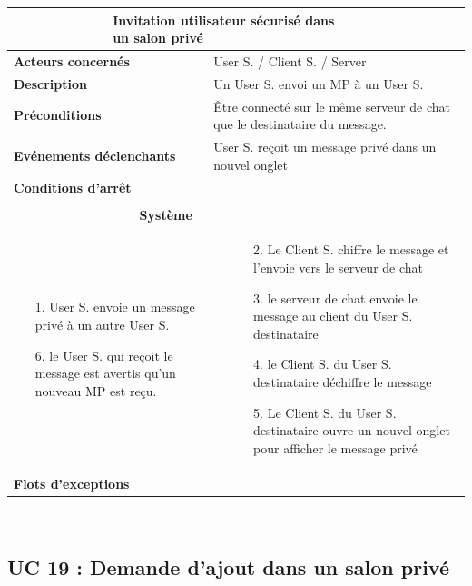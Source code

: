 \documentclass[a4paper,11pt,french]{article}
\newcommand{\fiche}[9] {
	\noindent
\begin{tabular}{|p{3.5cm}| p{1cm} | p{3cm} | p{.5cm} | p{7cm}|} 
\hline
\rowcolor{blue}
\multicolumn{2}{|l|}{\color{white}\bfseries{Nom}} & \multicolumn{3}{l|}{\color{white}\bfseries{#1}}\\
\hline
\multicolumn{2}{|l|}{\bfseries{Acteurs concernés}} & \multicolumn{3}{m{10.5cm}|}{#2}\\
\hline
\multicolumn{2}{|l|}{\bfseries{Description}} & \multicolumn{3}{m{10.5cm}|}{#3}\\
\hline
\multicolumn{2}{|l|}{\bfseries{Préconditions}} & \multicolumn{3}{m{10.5cm}|}{#4}\\
\hline
\multicolumn{2}{|l|}{\bfseries{Evénements déclenchants}} & \multicolumn{3}{m{10.5cm}|}{#5}\\
\hline
\multicolumn{2}{|l|}{\bfseries{Conditions d'arrêt}} & \multicolumn{3}{m{10.5cm}|}{#6}\\
\hline
\rowcolor{gray}
\multicolumn{5}{|c|}{\bfseries{Description du flot d'événements principal}}\\
\hline
\rowcolor{gray}
\multicolumn{3}{|c|}{\bfseries{Acteur(s)}} & \multicolumn{2}{c|}{\bfseries{Système}}\\
\hline
\multicolumn{3}{|p{7.5cm}|}{#7} & \multicolumn{2}{p{7.5cm}|}{#8}\\
\hline
\multicolumn{2}{|l}{\bfseries{Flots d'exceptions}} & \multicolumn{3}{|p{11.5cm}|}{#9}\\
\hline
\end{tabular}
\\
}
\begin{document}
\fiche
	{Invitation utilisateur sécurisé dans un salon privé} %
	{User S. / Client S. / Server} %
	{Un User S. envoi un MP à un User S.} %
	{Être connecté sur le même serveur de chat que le destinataire du message. } %
	{User S. reçoit un message privé dans un nouvel onglet} %
	{} %
	{\begin{itemize}  %
		\item [1.] User S. envoie un message privé à un autre User S.
		\item []
		\item []
		\item []
		\item []
		\item []
		\item []
		\item []
		\item [6.] le User S. qui reçoit le message est avertis qu’un nouveau MP est reçu.
	 \end{itemize}
	} 
	{\begin{itemize}  %
		\item []
		\item [2.] Le Client S. chiffre le message et l’envoie vers le serveur de chat
		\item [3.] le serveur de chat envoie le message au client du User S. destinataire
		\item [4.] le Client S. du User S. destinataire déchiffre le message
		\item [5.] Le Client S. du User S. destinataire ouvre un nouvel onglet pour afficher le message privé
	 \end{itemize}
	 }
	{} %

\subsection{UC 19 : Demande d’ajout dans un salon privé}
\end{document}

